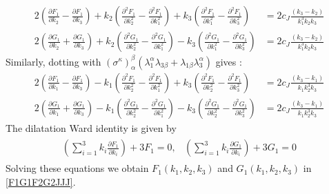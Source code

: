 \documentclass[a4paper,11pt]{article}
\begin{document}
\begin{align}
2\left(\frac{\partial F_1}{\partial k_2}-\frac{\partial F_1}{\partial k_3}\right)+k_2\left(\frac{\partial^2 F_1}{\partial k_2^2}-\frac{\partial^2 F_1}{\partial k_1^2}\right)+k_3\left(\frac{\partial^2 F_1}{\partial k_1^2}-\frac{\partial^2 F_1}{\partial k_3^2}\right)&=2c_J\frac{(k_3-k_2)}{k_1^3 k_2 k_3}\label{Feqn1}\\[5 pt]
2\left(\frac{\partial G_1}{\partial k_2}+\frac{\partial G_1}{\partial k_3}\right)+k_2\left(\frac{\partial^2 G_1}{\partial k_2^2}-\frac{\partial^2 G_1}{\partial k_1^2}\right)-k_3\left(\frac{\partial^2 G_1}{\partial k_1^2}-\frac{\partial^2 G_1}{\partial k_3^2}\right)&=2 c_J\frac{(k_3-k_2)}{k_1^3 k_2 k_3}\label{Geqn1}
\end{align}
Similarly, dotting with $(\sigma^{\kappa})_{\alpha}^{\beta}(\lambda_1^{\alpha}\lambda_{3\beta}+\lambda_{1\beta}\lambda_3^{\alpha})$ gives :
\begin{align}
2\left(\frac{\partial F_1}{\partial k_1}-\frac{\partial F_1}{\partial k_3}\right)-k_1\left(\frac{\partial^2 F_1}{\partial k_2^2}-\frac{\partial^2 F_1}{\partial k_1^2}\right)+k_3\left(\frac{\partial^2 F_1}{\partial k_2^2}-\frac{\partial^2 F_1}{\partial k_3^2}\right)&=2c_J\frac{(k_3-k_1)}{k_1 k_2^3 k_3}\label{Feqn2}\\[5 pt]
2\left(\frac{\partial G_1}{\partial k_1}+\frac{\partial G_1}{\partial k_3}\right)-k_1\left(\frac{\partial^2 G_1}{\partial k_2^2}-\frac{\partial^2 G_1}{\partial k_1^2}\right)-k_3\left(\frac{\partial^2 G_1}{\partial k_2^2}-\frac{\partial^2 G_1}{\partial k_3^2}\right)&=2c_J\frac{(k_3-k_1)}{k_1 k_2^3 k_3}\label{Geqn2}
\end{align}
The dilatation Ward identity is given by
\begin{align}
\begin{split}
\left(\sum_{i=1}^3 k_i \frac{\partial F_1}{\partial k_i}\right)+3F_1=0,
\end{split}
\begin{split}
\left(\sum_{i=1}^3 k_i \frac{\partial G_1}{\partial k_i}\right)+3G_1=0
\end{split}
\end{align}
Solving these equations we obtain $F_1(k_1, k_2, k_3)$ and $G_1(k_1, k_2, k_3)$ in \eqref{F1G1F2G2JJJ}.
\end{document}
